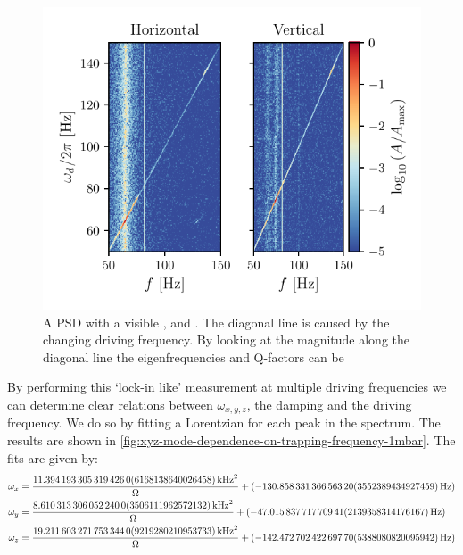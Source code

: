 \begin{figure}
    \centering
    \includegraphics{figures/data/xyz_mode_spectrum.pdf}
    \caption{A PSD with a visible \xmode, \ymode and \zmode. The diagonal line is caused by the changing driving frequency. By looking at the magnitude along the diagonal line the eigenfrequencies and Q-factors can be }
    \label{fig:xyz-mode-spectrum-1mbar}
\end{figure}

By performing this `lock-in like' measurement at multiple driving frequencies we can determine clear relations between $\omega_{x,y,z}$, the damping and the driving frequency. We do so by fitting a Lorentzian for each peak in the spectrum. The results are shown in \autoref{fig:xyz-mode-dependence-on-trapping-frequency-1mbar}. The fits are given by:
\begin{align}
    \omega_x &= \frac{\qty{ 11.394193305319426 \pm 0.6168138640026458 }{\square\kilo\hertz}}{\Omega} + (\qty{ -130.8583313665632 \pm 35.52389434927459 }{\hertz}) \\
    \omega_y &= \frac{\qty{ 8.61031330605224 \pm 0.3506111962572132 }{\square\kilo\hertz}}{\Omega} + (\qty{ -47.01583771770941 \pm 21.39358314176167 }{\hertz}) \\
    \omega_z &= \frac{\qty{ 19.211603271753344 \pm 0.9219280210953733 }{\square\kilo\hertz}}{\Omega} + (\qty{ -142.4727024226977 \pm 53.88080820095942 }{\hertz})
\end{align}

